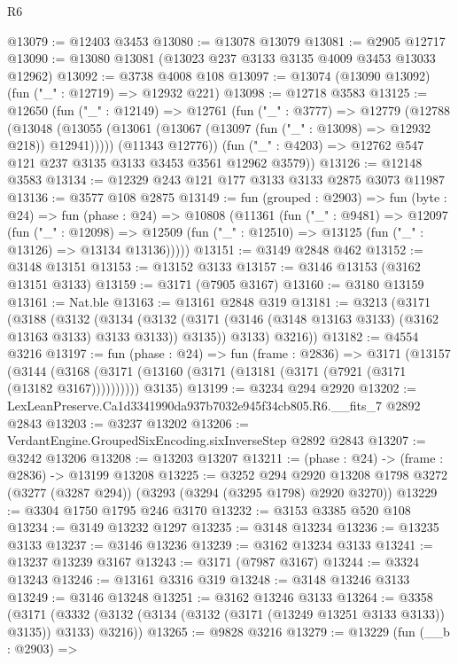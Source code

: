 \begin{lexlean}{R6}
\begin{coremodule}
@13079 := @12403 @3453
@13080 := @13078 @13079
@13081 := @2905 @12717
@13090 := @13080 @13081 (@13023 @237 @3133 @3135 @4009 @3453 @13033 @12962)
@13092 := @3738 @4008 @108
@13097 := @13074 (@13090 @13092) (fun ("_" : @12719) => @12932 @221)
@13098 := @12718 @3583
@13125 := @12650
    (fun ("_" : @12149) =>
    @12761
      (fun ("_" : @3777) =>
      @12779
        (@12788
          (@13048 (@13055 (@13061 (@13067 (@13097 (fun ("_" : @13098) => @12932 @218)) @12941)))))
        (@11343 @12776))
      (fun ("_" : @4203) => @12762 @547 @121 @237 @3135 @3133 @3453 @3561 @12962 @3579))
@13126 := @12148 @3583
@13134 := @12329 @243 @121 @177 @3133 @3133 @2875 @3073 @11987
@13136 := @3577 @108 @2875
@13149 := fun (grouped : @2903) =>
  fun (byte : @24) =>
  fun (phase : @24) =>
  @10808
    (@11361
      (fun ("_" : @9481) =>
      @12097
        (fun ("_" : @12098) =>
        @12509 (fun ("_" : @12510) => @13125 (fun ("_" : @13126) => @13134 @13136)))))
@13151 := @3149 @2848 @462
@13152 := @3148 @13151
@13153 := @13152 @3133
@13157 := @3146 @13153 (@3162 @13151 @3133)
@13159 := @3171 (@7905 @3167)
@13160 := @3180 @13159
@13161 := Nat.ble
@13163 := @13161 @2848 @319
@13181 := @3213
    (@3171
      (@3188
        (@3132
          (@3134
            (@3132 (@3171 (@3146 (@3148 @13163 @3133) (@3162 @13163 @3133) @3133 @3133)) @3135))
          @3133)
        @3216))
@13182 := @4554 @3216
@13197 := fun (phase : @24) =>
  fun (frame : @2836) =>
  @3171
    (@13157
      (@3144 (@3168 (@3171 (@13160 (@3171 (@13181 (@3171 (@7921 (@3171 (@13182 @3167))))))))))
      @3135)
@13199 := @3234 @294 @2920
@13202 := LexLeanPreserve.Ca1d3341990da937b7032e945f34cb805.R6.__fits_7 @2892 @2843
@13203 := @3237 @13202
@13206 := VerdantEngine.GroupedSixEncoding.sixInverseStep @2892 @2843
@13207 := @3242 @13206
@13208 := @13203 @13207
@13211 := (phase : @24) -> (frame : @2836) -> @13199 @13208
@13225 := @3252
    @294
    @2920
    @13208
    @1798
    @3272
    (@3277 (@3287 @294))
    (@3293 (@3294 (@3295 @1798) @2920 @3270))
@13229 := @3304 @1750 @1795 @246 @3170
@13232 := @3153 @3385 @520 @108
@13234 := @3149 @13232 @1297
@13235 := @3148 @13234
@13236 := @13235 @3133
@13237 := @3146 @13236
@13239 := @3162 @13234 @3133
@13241 := @13237 @13239 @3167
@13243 := @3171 (@7987 @3167)
@13244 := @3324 @13243
@13246 := @13161 @3316 @319
@13248 := @3148 @13246 @3133
@13249 := @3146 @13248
@13251 := @3162 @13246 @3133
@13264 := @3358
    (@3171 (@3332 (@3132 (@3134 (@3132 (@3171 (@13249 @13251 @3133 @3133)) @3135)) @3133) @3216))
@13265 := @9828 @3216
@13279 := @13229
    (fun (__b : @2903) =>

\end{coremodule}
\end{lexlean}

